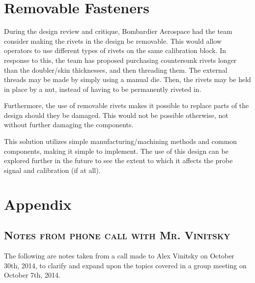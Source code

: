 \documentclass[12pt]{article}
\begin{document}
\newpage
\section{Removable Fasteners}

During the design review and critique, Bombardier Aerospace had the team consider making the rivets in the design be removable. This would allow operators to use different types of rivets on the same calibration block. In response to this, the team has proposed purchasing countersunk rivets longer than the doubler/skin thicknesses, and then threading them. The external threads may be made by simply using a manual die. Then, the rivets may be held in place by a nut, instead of having to be permanently riveted in.

Furthermore, the use of removable rivets makes it possible to replace parts of the design should they be damaged. This would not be possible otherwise, not without further damaging the components.

This solution utilizes simple manufacturing/machining methods and common components, making it simple to implement. The use of this design can be explored further in the future to see the extent to which it affects the probe signal and calibration (if at all).
\newpage

\section{Appendix}
\subsection{\textsc{Notes from phone call with Mr. Vinitsky}}
The following are notes taken from a call made to Alex Vinitsky on October 30th, 2014, to clarify and expand upon the topics covered in a group meeting on October 7th, 2014.
\end{document}
